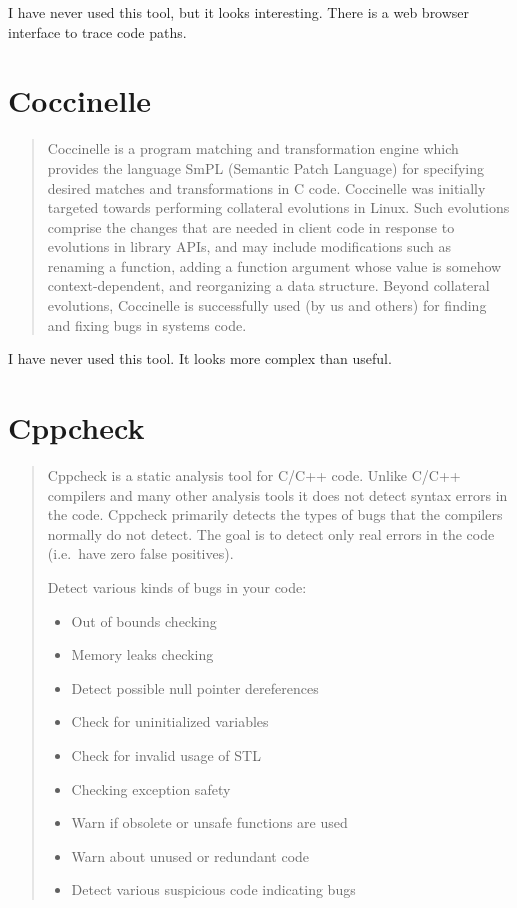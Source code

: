\documentclass[12pt]{article}
\begin{document}
I have never used this tool, but it looks interesting. There is a web
browser interface to trace code paths.

\cite{clang}
\section{Coccinelle}

\begin{quote}
Coccinelle is a program matching and transformation engine which
provides the language SmPL (Semantic Patch Language) for specifying
desired matches and transformations in C code. Coccinelle was initially
targeted towards performing collateral evolutions in Linux. Such
evolutions comprise the changes that are needed in client code in
response to evolutions in library APIs, and may include modifications
such as renaming a function, adding a function argument whose value is
somehow context-dependent, and reorganizing a data structure. Beyond
collateral evolutions, Coccinelle is successfully used (by us and others)
for finding and fixing bugs in systems code.
\end{quote}

I have never used this tool. It looks more complex than useful.

\cite{coccinelle}
\section{Cppcheck}

\begin{quote}
Cppcheck is a static analysis tool for C/C++ code. Unlike C/C++ compilers
and many other analysis tools it does not detect syntax errors in the
code. Cppcheck primarily detects the types of bugs that the compilers
normally do not detect. The goal is to detect only real errors in the code
(i.e.\ have zero false positives).

Detect various kinds of bugs in your code:

\begin{itemize}
    \item Out of bounds checking
    \item Memory leaks checking
    \item Detect possible null pointer dereferences
    \item Check for uninitialized variables
    \item Check for invalid usage of STL
    \item Checking exception safety
    \item Warn if obsolete or unsafe functions are used
    \item Warn about unused or redundant code
    \item Detect various suspicious code indicating bugs
\end{itemize}
\end{quote}
\end{document}
